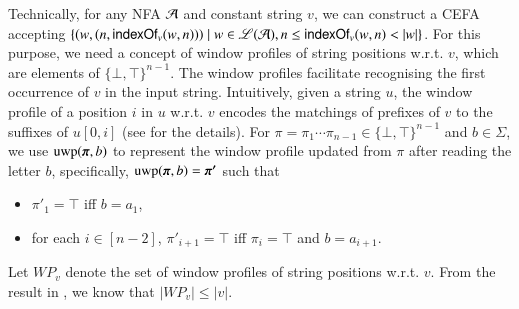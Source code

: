 Technically, for any NFA $\mathcal{A}$ and constant string $v$, we can construct a CEFA accepting $\{(w, (n, \mathsf{indexOf}_v(w, n)))\mid w\in \mathscr{L}(\mathcal{A}), n \le \mathsf{indexOf}_v(w, n) < |w| \}$. 
For this purpose, we need a concept of window profiles of  string positions w.r.t. $v$, which are elements of $\{\bot, \top\}^{n-1}$. The window profiles facilitate recognising the first occurrence of $v$ in the input string.  Intuitively, given a string $u$, the window profile of a position $i$ in $u$ w.r.t. $v$ encodes the matchings of prefixes of $v$ to the suffixes of $u[0,i]$ (see \cite{CCH+18} for the details). For $\pi = \pi_1 \cdots \pi_{n-1} \in \{\bot, \top\}^{n-1}$ and $b \in \Sigma$, we use $\uwp(\vec{\pi}, b)$ to represent the window profile updated from $\pi$ after reading the letter $b$, specifically, $\uwp(\vec{\pi}, b) = \vec{\pi'}$ such that  
\begin{itemize}
\item $\pi'_1 = \top$ iff $b = a_1$, 
%
\item for each $i \in [n-2]$, $\pi'_{i+1} = \top$ iff $\pi_{i} = \top$ and $b = a_{i+1}$. 
\end{itemize}
Let $WP_v$ denote the set of window profiles of string positions w.r.t. $v$. From the result in \cite{CCH+18}, we know that $|WP_v| \le |v|$. 

